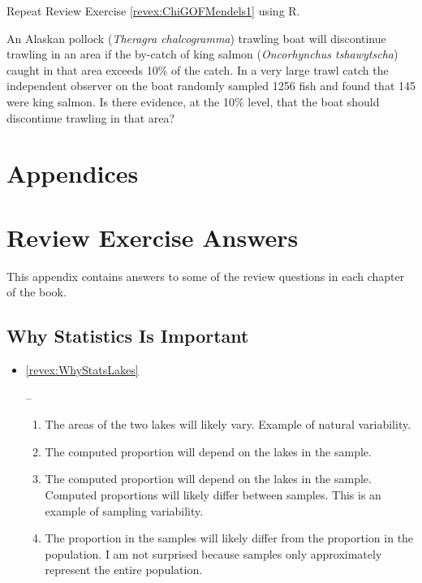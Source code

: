 \documentclass[10pt,openany]{book}\usepackage[]{graphicx}\usepackage[]{color}
\begin{document}
\begin{exsection}
  \item \label{revex:ChiGOFMendels1R} \rhw{} Repeat Review Exercise \ref{revex:ChiGOFMendels1} using R. 

  \item \label{revex:ChiGOFByCatch} \rhw{} An Alaskan pollock (\textit{Theragra chalcogramma}) trawling boat will discontinue trawling in an area if the by-catch of king salmon (\textit{Oncorhynchus tshawytscha}) caught in that area exceeds 10\% of the catch.  In a very large trawl catch the independent observer on the boat randomly sampled 1256 fish and found that 145 were king salmon.  Is there evidence, at the 10\% level, that the boat should discontinue trawling in that area? 
\end{exsection}

    \cleardoublepage
    \chapter*{Appendices}
    \appendix




\chapter{Review Exercise Answers}
\vspace{-60pt}
This appendix contains answers to some of the review questions in each chapter of the book.

\renewcommand{\labelenumi}{(\alph{enumi})}

\section*{Why Statistics Is Important}
\begin{itemize}
  \item \hypertarget{ans:WhyStatsLakes}{\ref{revex:WhyStatsLakes}} --
    \begin{enumerate}
      \item The areas of the two lakes will likely vary.  Example of natural variability.
      \item The computed proportion will depend on the lakes in the sample.
      \item The computed proportion will depend on the lakes in the sample.  Computed proportions will likely differ between samples.  This is an example of sampling variability.
      \item The proportion in the samples will likely differ from the proportion in the population.  I am not surprised because samples only approximately represent the entire population.
    \end{enumerate}
\end{itemize}
\end{document}
